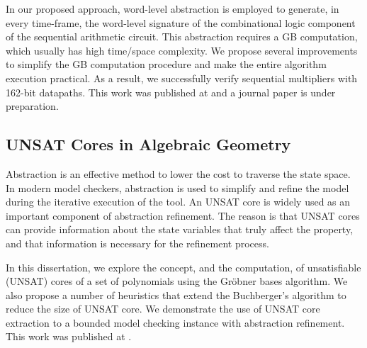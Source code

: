 In our proposed approach, word-level abstraction is employed to generate, in every time-frame, the 
word-level signature of the combinational logic component of the sequential 
arithmetic circuit. This abstraction requires a GB computation, which usually has high time/space 
complexity. We propose several improvements to simplify the GB computation procedure
and make the entire algorithm execution practical. As a result, we successfully verify sequential 
multipliers with 162-bit datapaths. This work was published at \cite{myDATE} and a journal paper
is under preparation.

\subsection{UNSAT Cores in Algebraic Geometry}
Abstraction is an effective method to lower the cost to traverse the state space.
In modern model checkers, abstraction is used to simplify and refine the model 
during the iterative execution of the tool. An UNSAT core is widely used 
as an important component of abstraction refinement. The reason is that UNSAT cores can provide 
information about the state variables that truly affect the property, 
and that information is necessary for the refinement process. 

In this dissertation, we explore the concept, and the computation, of unsatisfiable (UNSAT)
  cores of  a set of polynomials using the Gr\"obner bases algorithm. We also propose
a number of heuristics that extend the Buchberger's algorithm to reduce the size of UNSAT core. 
  We demonstrate the use of UNSAT core extraction 
  to a bounded model checking instance with abstraction refinement.
 This work was published at \cite{myCP}.


